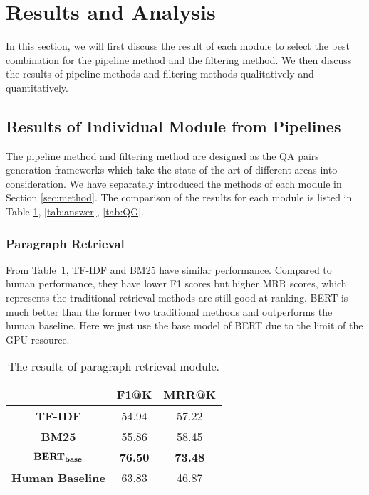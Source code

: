 \section{Results and Analysis}
\label{sec:res}

In this section, we will first discuss the result of each module to select the best combination for the pipeline method and the filtering method.
We then discuss the results of pipeline methods and filtering methods qualitatively and quantitatively.

\subsection{Results of Individual Module from Pipelines}
The pipeline method and filtering method are designed as the QA pairs generation frameworks which take the state-of-the-art of different areas into consideration.
We have separately introduced the methods of each module in Section \ref{sec:method}.
The comparison of the results for each module is listed in Table \ref{tab:retrieval}, \ref{tab:answer}, \ref{tab:QG}.

\subsubsection{Paragraph Retrieval}
From Table~\ref{tab:retrieval}, TF-IDF and BM25 have similar performance.
Compared to human performance, they have lower F1 scores but higher MRR scores, which represents the traditional retrieval methods are still good at ranking.
BERT is much better than the former two traditional methods and outperforms the human baseline. 
Here we just use the base model of BERT due to the limit of the GPU resource. 


\begin{table}[th]
\scriptsize
\centering
\begin{tabular}{ccc}
\toprule[1.5pt]
\textbf{} & \textbf{F1@K} & \textbf{MRR@K} \\ 
\midrule
\textbf{TF-IDF} & 54.94 & 57.22 \\ 
\textbf{BM25} & 55.86 & 58.45 \\ 
$\text{\textbf{BERT}}_{\text{\textbf{base}}}$ & \textbf{76.50} & \textbf{73.48} \\ 
\midrule
\textbf{Human Baseline} & 63.83 & 46.87\\
\bottomrule[1.5pt]
\end{tabular}
\caption{\label{tab:retrieval} The results of paragraph retrieval module.}
\end{table}


